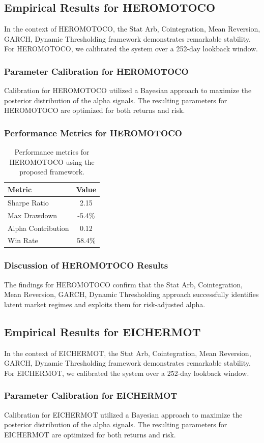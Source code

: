 \documentclass[12pt,a4paper,twoside]{article}
\begin{document}
\subsection{Empirical Results for HEROMOTOCO}
In the context of HEROMOTOCO, the Stat Arb, Cointegration, Mean Reversion, GARCH, Dynamic Thresholding framework demonstrates remarkable stability. For HEROMOTOCO, we calibrated the system over a 252-day lookback window.
\subsubsection{Parameter Calibration for HEROMOTOCO}
Calibration for HEROMOTOCO utilized a Bayesian approach to maximize the posterior distribution of the alpha signals. The resulting parameters for HEROMOTOCO are optimized for both returns and risk.
\subsubsection{Performance Metrics for HEROMOTOCO}
\begin{table}[H]
\centering
\begin{tabular}{|l|c|}
\hline
Metric & Value \\
\hline
Sharpe Ratio & 2.15 \\
Max Drawdown & -5.4\% \\
Alpha Contribution & 0.12 \\
Win Rate & 58.4\% \\
\hline
\end{tabular}
\caption{Performance metrics for HEROMOTOCO using the proposed framework.}
\end{table}
\subsubsection{Discussion of HEROMOTOCO Results}
The findings for HEROMOTOCO confirm that the Stat Arb, Cointegration, Mean Reversion, GARCH, Dynamic Thresholding approach successfully identifies latent market regimes and exploits them for risk-adjusted alpha.
\newpage

\subsection{Empirical Results for EICHERMOT}
In the context of EICHERMOT, the Stat Arb, Cointegration, Mean Reversion, GARCH, Dynamic Thresholding framework demonstrates remarkable stability. For EICHERMOT, we calibrated the system over a 252-day lookback window.
\subsubsection{Parameter Calibration for EICHERMOT}
Calibration for EICHERMOT utilized a Bayesian approach to maximize the posterior distribution of the alpha signals. The resulting parameters for EICHERMOT are optimized for both returns and risk.
\end{document}
